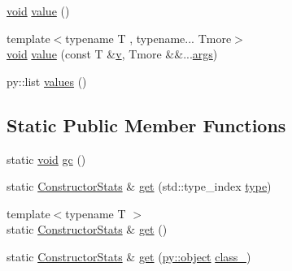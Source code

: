 \begin{DoxyCompactItemize}
\mbox{\hyperlink{_s_d_l__opengles2__gl2ext_8h_ae5d8fa23ad07c48bb609509eae494c95}{void}} \mbox{\hyperlink{class_constructor_stats_aa8b4d906166182a711c72c68b199efcf}{value}} ()
\item 
{\footnotesize template$<$typename T , typename... Tmore$>$ }\\\mbox{\hyperlink{_s_d_l__opengles2__gl2ext_8h_ae5d8fa23ad07c48bb609509eae494c95}{void}} \mbox{\hyperlink{class_constructor_stats_a12d3e90daf9fe41b09fa8d2bd970d664}{value}} (const T \&\mbox{\hyperlink{_s_d_l__opengl_8h_a10a82eabcb59d2fcd74acee063775f90}{v}}, Tmore \&\&...\mbox{\hyperlink{classargs}{args}})
\item 
py\+::list \mbox{\hyperlink{class_constructor_stats_a4d448ff07df374001c45dc31b8f3a105}{values}} ()
\end{DoxyCompactItemize}
\subsection*{Static Public Member Functions}
\begin{DoxyCompactItemize}
\item 
static \mbox{\hyperlink{_s_d_l__opengles2__gl2ext_8h_ae5d8fa23ad07c48bb609509eae494c95}{void}} \mbox{\hyperlink{class_constructor_stats_adb2571c4bdda1fadccc7a7a7af5a3bc7}{gc}} ()
\item 
static \mbox{\hyperlink{class_constructor_stats}{Constructor\+Stats}} \& \mbox{\hyperlink{class_constructor_stats_a6766d3e57ee38f5e64151c83e0e6c0d3}{get}} (std\+::type\+\_\+index \mbox{\hyperlink{_s_d_l__opengl_8h_ad5ddf6fca7b585646515660e810e0188}{type}})
\item 
{\footnotesize template$<$typename T $>$ }\\static \mbox{\hyperlink{class_constructor_stats}{Constructor\+Stats}} \& \mbox{\hyperlink{class_constructor_stats_a0f17a4707348b90553c2e5920fc6f9a4}{get}} ()
\item 
static \mbox{\hyperlink{class_constructor_stats}{Constructor\+Stats}} \& \mbox{\hyperlink{class_constructor_stats_aee1d74bbf24b9e0989cb53f69ef48da7}{get}} (\mbox{\hyperlink{_s_d_l__opengles2__gl2ext_8h_ab49790263c78300fbf05719e38246198}{py\+::object}} \mbox{\hyperlink{classclass__}{class\+\_\+}})
\end{DoxyCompactItemize}
